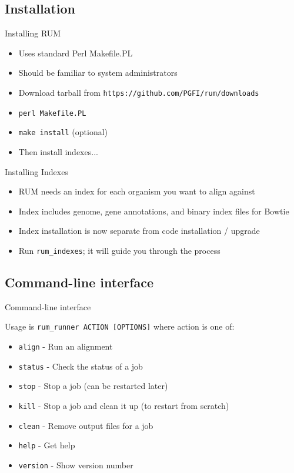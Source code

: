 \documentclass{beamer}
\begin{document}
\subsection{Installation}

\begin{frame}{Installing RUM}
  \begin{itemize}
  \item Uses standard Perl Makefile.PL
  \item Should be familiar to system administrators
  \item Download tarball from \texttt{https://github.com/PGFI/rum/downloads}
  \item \texttt{perl Makefile.PL}
  \item \texttt{make install} (optional)
  \item Then install indexes...
  \end{itemize}
\end{frame}

\begin{frame}{Installing Indexes}
  \begin{itemize}
  \item RUM needs an index for each organism you want to align against
  \item Index includes genome, gene annotations, and binary index files for Bowtie
  \item Index installation is now separate from code installation / upgrade
  \item Run \texttt{rum\_indexes}; it will guide you through the process
  \end{itemize}
\end{frame}

\subsection{Command-line interface}

\begin{frame}{Command-line interface}

  Usage is \texttt{rum\_runner ACTION [OPTIONS]} where action is one of:

  \begin{itemize}
  \item \texttt{align} - Run an alignment
  \item \texttt{status} - Check the status of a job
  \item \texttt{stop} - Stop a job (can be restarted later)
  \item \texttt{kill} - Stop a job and clean it up (to restart from scratch)
  \item \texttt{clean} - Remove output files for a job
  \item \texttt{help} - Get help
  \item \texttt{version} - Show version number
  \end{itemize}

\end{frame}
\end{document}
